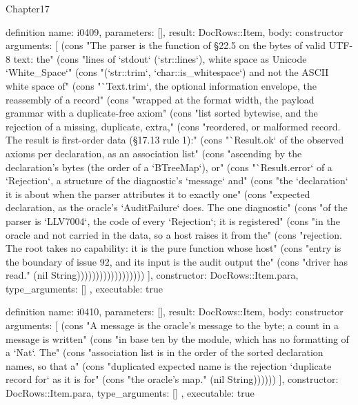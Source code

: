 \begin{lexlean}{Chapter17}
\begin{semanticmodule}
definition{
  name: i0409,
  parameters: [],
  result: DocRows::Item,
  body: constructor{
    arguments: [
      (cons "The parser is the function of §22.5 on the bytes of valid UTF-8 text: the" (cons "lines of `stdout` (`str::lines`), white space as Unicode `White_Space`" (cons "(`str::trim`, `char::is_whitespace`) and not the ASCII white space of" (cons "`Text.trim`, the optional information envelope, the reassembly of a record" (cons "wrapped at the format width, the payload grammar with a duplicate-free axiom" (cons "list sorted bytewise, and the rejection of a missing, duplicate, extra," (cons "reordered, or malformed record. The result is first-order data (§17.13 rule 1):" (cons "`Result.ok` of the observed axioms per declaration, as an association list" (cons "ascending by the declaration's bytes (the order of a `BTreeMap`), or" (cons "`Result.error` of a `Rejection`, a structure of the diagnostic's `message` and" (cons "the `declaration` it is about when the parser attributes it to exactly one" (cons "expected declaration, as the oracle's `AuditFailure` does. The one diagnostic" (cons "of the parser is `LLV7004`, the code of every `Rejection`; it is registered" (cons "in the oracle and not carried in the data, so a host raises it from the" (cons "rejection. The root takes no capability: it is the pure function whose host" (cons "entry is the boundary of issue 92, and its input is the audit output the" (cons "driver has read." (nil String))))))))))))))))))
    ],
    constructor: DocRows::Item.para,
    type_arguments: []
  },
  executable: true
}

definition{
  name: i0410,
  parameters: [],
  result: DocRows::Item,
  body: constructor{
    arguments: [
      (cons "A message is the oracle's message to the byte; a count in a message is written" (cons "in base ten by the module, which has no formatting of a `Nat`. The" (cons "association list is in the order of the sorted declaration names, so that a" (cons "duplicated expected name is the rejection `duplicate record for` as it is for" (cons "the oracle's map." (nil String))))))
    ],
    constructor: DocRows::Item.para,
    type_arguments: []
  },
  executable: true
}


\end{semanticmodule}
\end{lexlean}
